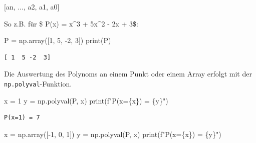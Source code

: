 \documentclass[
  letterpaper,
  DIV=11,
  numbers=noendperiod]{scrreprt}
\newenvironment{Shaded}{\begin{snugshade}}{\end{snugshade}}
\newcommand{\BuiltInTok}[1]{\textcolor[rgb]{0.00,0.23,0.31}{#1}}
\newcommand{\DecValTok}[1]{\textcolor[rgb]{0.68,0.00,0.00}{#1}}
\newcommand{\NormalTok}[1]{\textcolor[rgb]{0.00,0.23,0.31}{#1}}
\newcommand{\OperatorTok}[1]{\textcolor[rgb]{0.37,0.37,0.37}{#1}}
\newcommand{\SpecialCharTok}[1]{\textcolor[rgb]{0.37,0.37,0.37}{#1}}
\newcommand{\SpecialStringTok}[1]{\textcolor[rgb]{0.13,0.47,0.30}{#1}}
\begin{document}
\begin{Shaded}
\begin{Highlighting}[]
\NormalTok{[an, ..., a2, a1, a0]}
\end{Highlighting}
\end{Shaded}

So z.B. für \$ P(x) = x\^{}3 + 5x\^{}2 - 2x + 3\$:

\begin{Shaded}
\begin{Highlighting}[]
\NormalTok{P }\OperatorTok{=}\NormalTok{ np.array([}\DecValTok{1}\NormalTok{, }\DecValTok{5}\NormalTok{, }\OperatorTok{{-}}\DecValTok{2}\NormalTok{, }\DecValTok{3}\NormalTok{])}
\BuiltInTok{print}\NormalTok{(P)}
\end{Highlighting}
\end{Shaded}

\begin{verbatim}
[ 1  5 -2  3]
\end{verbatim}

Die Auswertung des Polynoms an einem Punkt oder einem Array erfolgt mit
der \texttt{np.polyval}-Funktion.

\begin{Shaded}
\begin{Highlighting}[]
\NormalTok{x }\OperatorTok{=} \DecValTok{1}
\NormalTok{y }\OperatorTok{=}\NormalTok{ np.polyval(P, x)}
\BuiltInTok{print}\NormalTok{(}\SpecialStringTok{f"P(x=}\SpecialCharTok{\{}\NormalTok{x}\SpecialCharTok{\}}\SpecialStringTok{) = }\SpecialCharTok{\{}\NormalTok{y}\SpecialCharTok{\}}\SpecialStringTok{"}\NormalTok{)}
\end{Highlighting}
\end{Shaded}

\begin{verbatim}
P(x=1) = 7
\end{verbatim}

\begin{Shaded}
\begin{Highlighting}[]
\NormalTok{x }\OperatorTok{=}\NormalTok{ np.array([}\OperatorTok{{-}}\DecValTok{1}\NormalTok{, }\DecValTok{0}\NormalTok{, }\DecValTok{1}\NormalTok{])}
\NormalTok{y }\OperatorTok{=}\NormalTok{ np.polyval(P, x)}
\BuiltInTok{print}\NormalTok{(}\SpecialStringTok{f"P(x=}\SpecialCharTok{\{}\NormalTok{x}\SpecialCharTok{\}}\SpecialStringTok{) = }\SpecialCharTok{\{}\NormalTok{y}\SpecialCharTok{\}}\SpecialStringTok{"}\NormalTok{)}
\end{Highlighting}
\end{Shaded}
\end{document}
